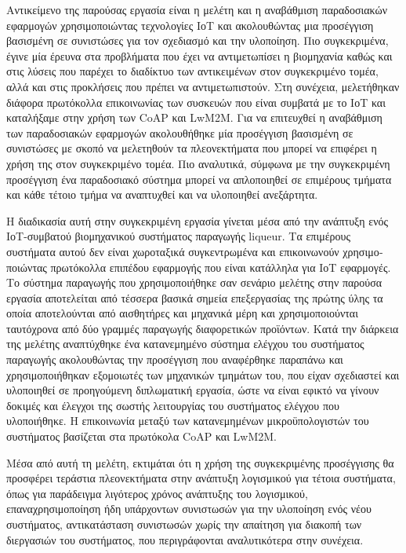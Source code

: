 Αντικείμενο της παρούσας εργασία είναι η μελέτη και η αναβάθμιση παραδοσιακών εφαρμογών χρησιμοποιώντας τεχνολογίες ΙοΤ και ακολουθώντας μια προσέγγιση βασισμένη σε συνιστώσες για τον σχεδιασμό και την υλοποίηση. Πιο συγκεκριμένα, έγινε μία έρευνα στα προβλήματα που έχει να αντιμετωπίσει η βιομηχανία καθώς και στις λύσεις που παρέχει το διαδίκτυο των αντικειμένων στον συγκεκριμένο τομέα, αλλά και στις προκλήσεις που πρέπει να αντιμετωπιστούν. Στη συνέχεια, μελετήθηκαν διάφορα πρωτόκολλα επικοινωνίας των συσκευών που είναι συμβατά με το ΙοΤ και καταλήξαμε στην χρήση των CoAP και LwM2M. Για να επιτευχθεί η αναβάθμιση των παραδοσιακών εφαρμογών ακολουθήθηκε μία προσέγγιση βασισμένη σε συνιστώσες με σκοπό να μελετηθούν τα πλεονεκτήματα που μπορεί να επιφέρει η χρήση της στον συγκεκριμένο τομέα. Πιο αναλυτικά, σύμφωνα με την συγκεκριμένη προσέγγιση ένα παραδοσιακό σύστημα μπορεί να απλοποιηθεί σε επιμέρους τμήματα και κάθε τέτοιο τμήμα να αναπτυχθεί και να υλοποιηθεί ανεξάρτητα. 

Η διαδικασία αυτή στην συγκεκριμένη εργασία γίνεται μέσα από την ανάπτυξη ενός ΙοΤ-συμβατού βιομηχανικού συστήματος παραγωγής liqueur. Τα επιμέρους συστήματα αυ­τού δεν είναι χωροταξικά συγκεντρωμένα και επικοινωνούν χρησιμο­ποιώντας πρωτόκολλα επιπέδου εφαρμογής που είναι κατάλληλα για ΙοΤ εφαρμογές. Το σύστημα παραγωγής που χρησιμοποιήθηκε σαν σενάριο μελέτης στην παρούσα εργασία αποτελείται από τέσσερα βασικά σημεία επεξεργασίας της πρώτης ύλης τα οποία αποτελούνται από αισθητήρες και μηχανικά μέρη και χρησιμοποιούνται ταυτόχρονα από δύο γραμμές παραγωγής διαφορετικών προϊόντων. Κατά την διάρ­κεια της μελέτης αναπτύχθηκε ένα κατανεμημένο σύστημα ελέγχου του συστήματος παραγωγής ακολουθώντας την προσέγγιση που αναφέρθηκε παραπάνω και χρησιμοποιήθηκαν εξομοιωτές των μηχανι­κών τμημάτων του, που είχαν σχεδιαστεί και υλοποιηθεί σε προηγούμενη διπλωματική εργασία, ώστε να είναι εφικτό να γίνουν δοκιμές και έλεγχοι της σωστής λειτουργίας του συστήματος ελέγχου που υλοποιήθηκε. Η επικοινωνία μεταξύ των κατανεμημένων μικροϋπολογιστών του συστήματος βασίζεται στα πρωτόκολα CoAP και LwM2M.

Μέσα από αυτή τη μελέτη, εκτιμάται ότι η χρήση της συγκεκριμένης προσέγγισης θα προσφέρει τεράστια πλεονεκτήματα στην ανάπτυξη λογισμικού για τέτοια συστήματα, όπως για παράδειγμα λιγότερος χρόνος ανάπτυξης του λογισμικού, επαναχρησιμοποίηση ήδη υπάρχοντων συνιστωσών για την υλοποίηση ενός νέου συστήματος, αντικατάσταση συνιστωσών χωρίς την απαίτηση για διακοπή των διεργασιών του συστήματος, που περιγράφονται αναλυτικότερα στην συνέχεια. 

